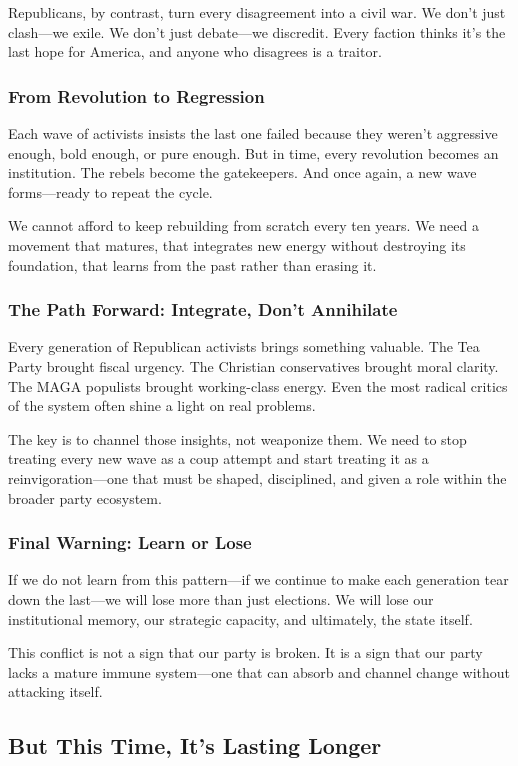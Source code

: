 Republicans, by contrast, turn every disagreement into a civil war. We don’t just clash—we exile. We don’t just debate—we discredit. Every faction thinks it’s the last hope for America, and anyone who disagrees is a traitor.

\subsubsection{From Revolution to Regression}
Each wave of activists insists the last one failed because they weren’t aggressive enough, bold enough, or pure enough. But in time, every revolution becomes an institution. The rebels become the gatekeepers. And once again, a new wave forms—ready to repeat the cycle.

We cannot afford to keep rebuilding from scratch every ten years. We need a movement that matures, that integrates new energy without destroying its foundation, that learns from the past rather than erasing it.

\subsubsection{The Path Forward: Integrate, Don’t Annihilate}
Every generation of Republican activists brings something valuable. The Tea Party brought fiscal urgency. The Christian conservatives brought moral clarity. The MAGA populists brought working-class energy. Even the most radical critics of the system often shine a light on real problems.

The key is to channel those insights, not weaponize them. We need to stop treating every new wave as a coup attempt and start treating it as a reinvigoration—one that must be shaped, disciplined, and given a role within the broader party ecosystem.

\subsubsection{Final Warning: Learn or Lose}
If we do not learn from this pattern—if we continue to make each generation tear down the last—we will lose more than just elections. We will lose our institutional memory, our strategic capacity, and ultimately, the state itself.

This conflict is not a sign that our party is broken. It is a sign that our party lacks a mature immune system—one that can absorb and channel change without attacking itself.

\subsection{But This Time, It’s Lasting Longer}

